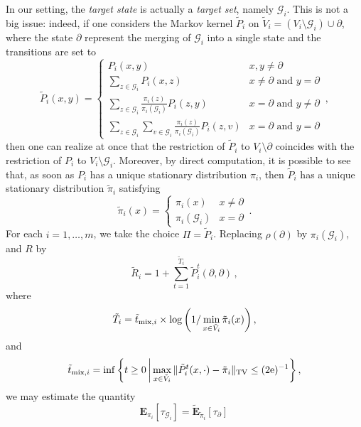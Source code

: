 \documentclass[11pt,oneside]{amsart}
\numberwithin{equation}{section}  %
\theoremstyle{plain}
\newcommand{\gates}{\mathcal{G}}
\begin{document}
In our setting, the \emph{target state} is actually a \emph{target set}, namely $\gates_i$. This is not a big issue: indeed, if one considers the Markov kernel $\tilde P_i$ on $\tilde V_i=(V_i\setminus\gates_i)\cup\partial$, where the state $\partial$ represent the merging of $\gates_i$ into a single state and the transitions are set to
\begin{equation}
	\tilde P_i(x,y)=\begin{cases}
		P_i(x,y)&x,y\neq \partial\\
		\sum_{z\in\gates_i}P_i(x,z)&x\neq\partial\text{ and }y=\partial\\
		\sum_{z\in\gates_i}\frac{\pi_i(z)}{\pi_i(\gates_i)}P_i(z,y)&x=\partial\text{ and }y\neq\partial\\
		\sum_{z\in\gates_i}\sum_{v\in\gates_i}\frac{\pi_i(z)}{\pi_i(\gates_i)}P_i(z,v)&x=\partial\text{ and }y=\partial
	\end{cases}\,,
\end{equation}
then one can realize at once that the restriction of $\tilde P_i$ to $V_i\setminus \partial$ coincides with the restriction of $P_i$ to $V_i\setminus\gates_i$. Moreover, by direct computation, it is possible to see that, as soon as $P_i$ has a unique stationary distribution $\pi_i$, then $\tilde P_i$ has a unique stationary distribution $\tilde \pi_i$ satisfying
\begin{equation}
	\tilde \pi_i(x)=\begin{cases}
		\pi_i(x)&x\neq\partial\\
		\pi_i(\gates_i)&x=\partial
	\end{cases}\,.
\end{equation}
 For each $i=1,\dots,m$, we take the choice $\Pi=\tilde P_i$.  
Replacing $\rho(\partial)$ by $\pi_i(\gates_i)$, and $R$ by
\begin{equation}\label{eq:def-R-i}
	\tilde R_i=1+\sum_{t=1}^{\tilde T_i}\tilde P_i^t(\partial,\partial)\,,
\end{equation}
where
\begin{equation}
	\tilde T_i=	\tilde{t}_{{\rm mix},i} \times\log\bigg(1/\min_{x\in \tilde V_i}\tilde{\pi}_i(x)\bigg)\,,
\end{equation}
and
\begin{equation}\label{eq:def-tilde-tmix}
	\tilde{t}_{{\rm mix},i}= \inf\left\{t\ge 0\,\bigg\rvert \max_{x\in \tilde V_i}\|\tilde{P}_i^t(x,\cdot)-\tilde{\pi}_i \|_{\rm TV}\le  (2{\rm e})^{-1} \right\},
\end{equation}
we may estimate the quantity
\begin{equation}
	\mathbf{E}_{\pi_i}[\tau_{\gates_i}]=\tilde{\mathbf{E}}_{\tilde\pi_i}[\tau_{\partial}]\,
\end{equation}
\end{document}

